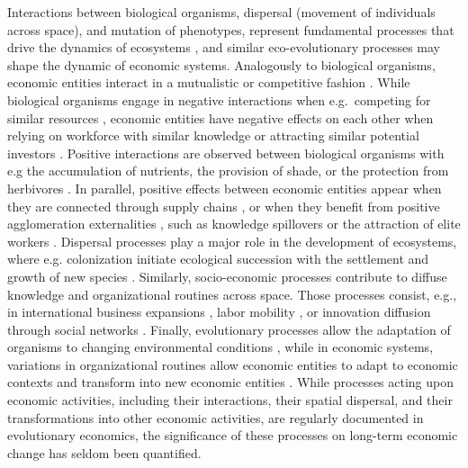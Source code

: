   Interactions between biological organisms, dispersal (movement of individuals across space), and mutation of phenotypes, represent fundamental processes that drive the dynamics of ecosystems \citep{Vellend2010}, and similar eco-evolutionary processes may shape the dynamic of economic systems.
  Analogously to biological organisms, economic entities interact in a mutualistic or competitive fashion \citep{Pistorius1997}. While biological organisms engage in negative interactions when e.g.~competing for similar resources \citep{GRIME1973}, economic entities have negative effects on each other when relying on workforce with similar knowledge or attracting similar potential investors \citep{Wernerfelt1989}.
  Positive interactions are observed between biological organisms with e.g the accumulation of nutrients, the provision of shade, or the protection from herbivores \citep{Callaway2002}. In parallel, positive effects between economic entities appear when they are connected through supply chains \citep{Ozman2009,Saavedra2009a}, or when they benefit from positive agglomeration externalities \citep{VanDerPanne2004}, such as knowledge spillovers \citep{Caragliu2016} or the attraction of elite workers \citep{Cohendet2018}.
  Dispersal processes play a major role in the development of ecosystems, where e.g. colonization initiate ecological succession with the settlement and growth of new species \citep{Leibold2004}. Similarly, socio-economic processes contribute to diffuse knowledge and organizational routines across space. Those processes consist, e.g., in international business expansions \citep{Zahra2000}, labor mobility \citep{Boschma2008}, or innovation diffusion through social networks \citep{RogersEverettM2003DoI}.
  Finally, evolutionary processes allow the adaptation of organisms to changing environmental conditions \citep{Bell2017}, while in economic systems, variations in organizational routines allow economic entities to adapt to economic contexts \citep{Cordes2006} and transform into new economic entities \citep{Freeman2002,Hodgson2004,Aldrich2008}. %
  While processes acting upon economic activities, including their interactions, their spatial dispersal, and their transformations into other economic activities, are regularly documented in evolutionary economics, the significance of these processes on long-term economic change has seldom been quantified.%

